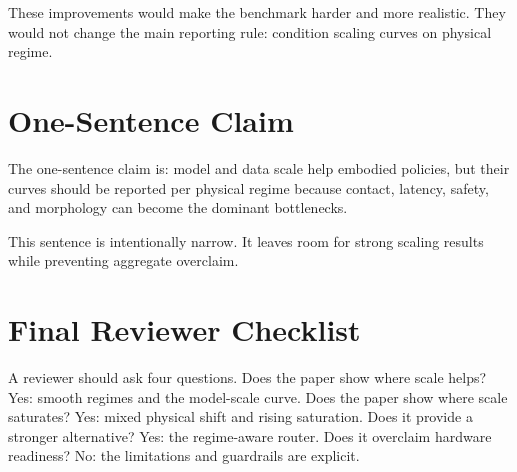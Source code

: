 These improvements would make the benchmark harder and more realistic. They would not change the main reporting rule: condition scaling curves on physical regime.

\section{One-Sentence Claim}

The one-sentence claim is: model and data scale help embodied policies, but their curves should be reported per physical regime because contact, latency, safety, and morphology can become the dominant bottlenecks.

This sentence is intentionally narrow. It leaves room for strong scaling results while preventing aggregate overclaim.

\section{Final Reviewer Checklist}

A reviewer should ask four questions. Does the paper show where scale helps? Yes: smooth regimes and the model-scale curve. Does the paper show where scale saturates? Yes: mixed physical shift and rising saturation. Does it provide a stronger alternative? Yes: the regime-aware router. Does it overclaim hardware readiness? No: the limitations and guardrails are explicit.

